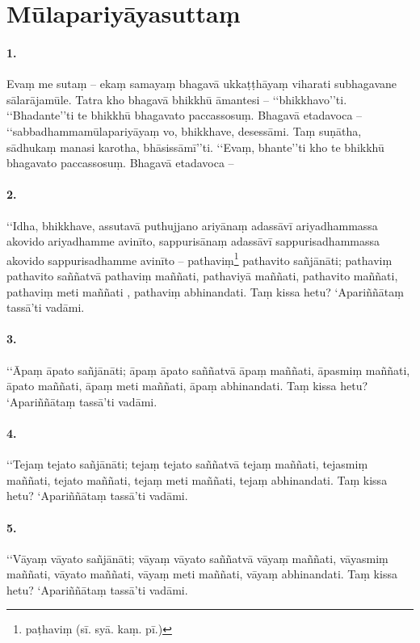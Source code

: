 \section{Mūlapariyāyasuttaṃ}

\paragraph{1.} Evaṃ me sutaṃ – ekaṃ samayaṃ bhagavā ukkaṭṭhāyaṃ viharati subhagavane sālarājamūle. Tatra kho bhagavā bhikkhū āmantesi – ‘‘bhikkhavo’’ti. ‘‘Bhadante’’ti te bhikkhū bhagavato paccassosuṃ. Bhagavā etadavoca – ‘‘sabbadhammamūlapariyāyaṃ vo, bhikkhave, desessāmi. Taṃ suṇātha, sādhukaṃ manasi karotha, bhāsissāmī’’ti. ‘‘Evaṃ, bhante’’ti kho te bhikkhū bhagavato paccassosuṃ. Bhagavā etadavoca –

\paragraph{2.} ‘‘Idha, bhikkhave, assutavā puthujjano ariyānaṃ adassāvī ariyadhammassa akovido ariyadhamme avinīto, sappurisānaṃ adassāvī sappurisadhammassa akovido sappurisadhamme avinīto – pathaviṃ\footnote{paṭhaviṃ (sī. syā. kaṃ. pī.)} pathavito sañjānāti; pathaviṃ pathavito saññatvā pathaviṃ maññati, pathaviyā maññati, pathavito maññati, pathaviṃ meti maññati , pathaviṃ abhinandati. Taṃ kissa hetu? ‘Apariññātaṃ tassā’ti vadāmi.

\paragraph{3.} ‘‘Āpaṃ āpato sañjānāti; āpaṃ āpato saññatvā āpaṃ maññati, āpasmiṃ maññati, āpato maññati, āpaṃ meti maññati, āpaṃ abhinandati. Taṃ kissa hetu? ‘Apariññātaṃ tassā’ti vadāmi.

\paragraph{4.} ‘‘Tejaṃ tejato sañjānāti; tejaṃ tejato saññatvā tejaṃ maññati, tejasmiṃ maññati, tejato maññati, tejaṃ meti maññati, tejaṃ abhinandati. Taṃ kissa hetu? ‘Apariññātaṃ tassā’ti vadāmi.

\paragraph{5.} ‘‘Vāyaṃ vāyato sañjānāti; vāyaṃ vāyato saññatvā vāyaṃ maññati, vāyasmiṃ maññati, vāyato maññati, vāyaṃ meti maññati, vāyaṃ abhinandati. Taṃ kissa hetu? ‘Apariññātaṃ tassā’ti vadāmi.

